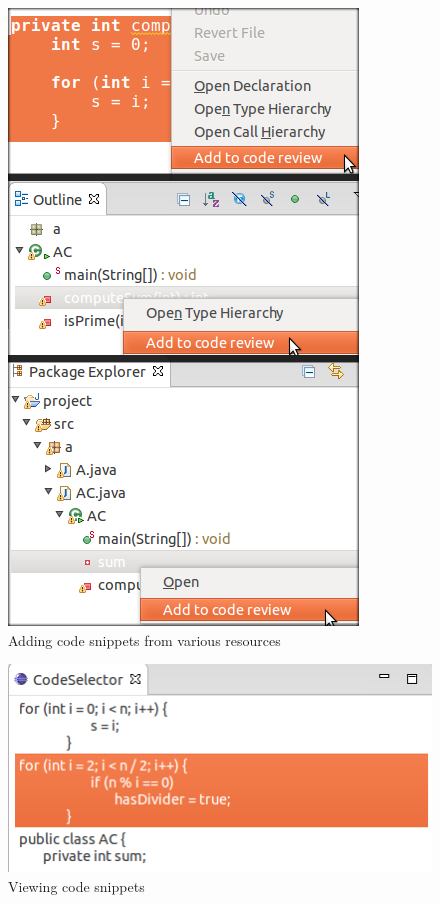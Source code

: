 \documentclass{sigchi}
\begin{document}
\begin{figure}[hbt]
	\centering
	\includegraphics[scale=0.4]{snippetSelections.png}
\caption{Adding code snippets from various resources}
\label{fig:snippetSelection}
\end{figure}

\begin{figure}[hbt]
	\centering
	\includegraphics[scale=0.45]{snippetViewer.png}
\caption{Viewing code snippets}
\label{fig:snippetViewer}
\end{figure}
\end{document}
